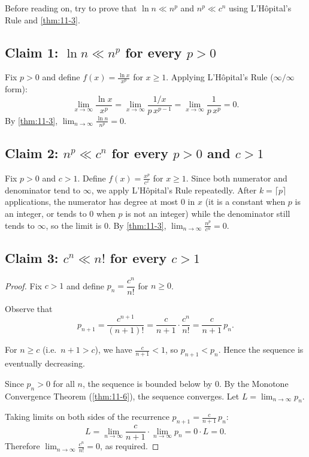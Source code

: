 \begin{remark}
Before reading on, try to prove that $\ln n\ll n^{p}$ and $n^{p}\ll c^{n}$ using L'H\^opital's Rule and \cref{thm:11-3}.
\end{remark}

\subsection*{Claim 1: $\ln n \ll n^{p}$ for every $p>0$}

Fix $p>0$ and define $f(x)=\frac{\ln x}{x^{p}}$ for $x\ge 1$.  Applying L'H\^opital's Rule ($\infty/\infty$ form):
\[
  \lim_{x\to\infty}\frac{\ln x}{x^{p}}
  =\lim_{x\to\infty}\frac{1/x}{p\,x^{p-1}}
  =\lim_{x\to\infty}\frac{1}{p\,x^{p}}=0.
\]
By \cref{thm:11-3}, $\lim_{n\to\infty}\frac{\ln n}{n^{p}}=0$.

\subsection*{Claim 2: $n^{p}\ll c^{n}$ for every $p>0$ and $c>1$}

Fix $p>0$ and $c>1$.  Define $f(x)=\frac{x^{p}}{c^{x}}$ for $x\ge 1$.  Since both numerator and denominator tend to $\infty$, we apply L'H\^opital's Rule repeatedly.  After $k=\lceil p\rceil$ applications, the numerator has degree at most $0$ in $x$ (it is a constant when $p$ is an integer, or tends to $0$ when $p$ is not an integer) while the denominator still tends to $\infty$, so the limit is $0$.  By \cref{thm:11-3}, $\lim_{n\to\infty}\frac{n^{p}}{c^{n}}=0$.

\subsection*{Claim 3: $c^{n}\ll n!$ for every $c>1$}

\begin{proof}
Fix $c>1$ and define $p_{n}=\dfrac{c^{n}}{n!}$ for $n\ge 0$.


Observe that
\[
  p_{n+1}=\frac{c^{n+1}}{(n+1)!}=\frac{c}{n+1}\cdot\frac{c^{n}}{n!}=\frac{c}{n+1}\,p_{n}.
\]


For $n\ge c$ (i.e.\ $n+1>c$), we have $\frac{c}{n+1}<1$, so $p_{n+1}<p_{n}$.  Hence the sequence is eventually decreasing.


Since $p_{n}>0$ for all $n$, the sequence is bounded below by $0$.  By the Monotone Convergence Theorem (\cref{thm:11-6}), the sequence converges.  Let $L=\lim_{n\to\infty}p_{n}$.


Taking limits on both sides of the recurrence $p_{n+1}=\frac{c}{n+1}\,p_{n}$:
\[
  L = \lim_{n\to\infty}\frac{c}{n+1}\cdot\lim_{n\to\infty}p_{n}= 0\cdot L=0.
\]
Therefore $\lim_{n\to\infty}\frac{c^{n}}{n!}=0$, as required.
\end{proof}

